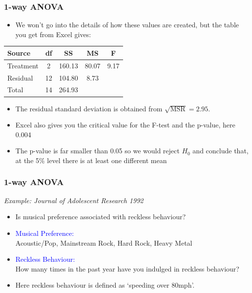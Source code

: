 \documentclass[12pt,xcolor=dvipsnames,handout,mathserif,aspectratio=169]{beamer}
\newcommand{\tc}{\textcolor}
\begin{document}
\begin{frame}\frametitle{1-way ANOVA}
\begin{itemize}
\item We won't go into the details of how these values are created, but the table you get from Excel gives:
\end{itemize}
\begin{center}
{\small{
\begin{tabular}{lcccc}\hline
Source &df& SS& MS& F\\ \hline
Treatment & 2 &160.13& 80.07& 9.17\\
Residual &12& 104.80& 8.73&\\ \hline
Total &14 &264.93&&\\\hline
\end{tabular}}}
\end{center}
\vspace*{0.3cm}
\begin{itemize}
\item The residual standard deviation is obtained from $\sqrt{\mbox{MSR}} = 2.95$.
\item Excel also gives you the critical value for the F-test and the p-value, here 0.004
\item The p-value is far smaller than 0.05 so we would reject $H_0$ and conclude that, at the 5\% level there is at least one different mean
\end{itemize}
\end{frame}


\begin{frame}\frametitle{1-way ANOVA }
\emph{Example: Journal of Adolescent Research 1992} 
\vspace{0.3cm}
\begin{itemize}
\item Is musical preference associated with reckless behaviour?
\vspace{0.3cm}
\item \tc{blue}{Musical Preference:}\\
Acoustic/Pop, Mainstream Rock, Hard Rock, Heavy Metal
\vspace{0.3cm}
\item \tc{blue}{Reckless Behaviour:}\\
How many times in the past year have you indulged in reckless behaviour?
\vspace{0.3cm}
\item Here reckless behaviour is defined as `speeding over 80mph'.
\end{itemize}
\end{frame}
\end{document}
